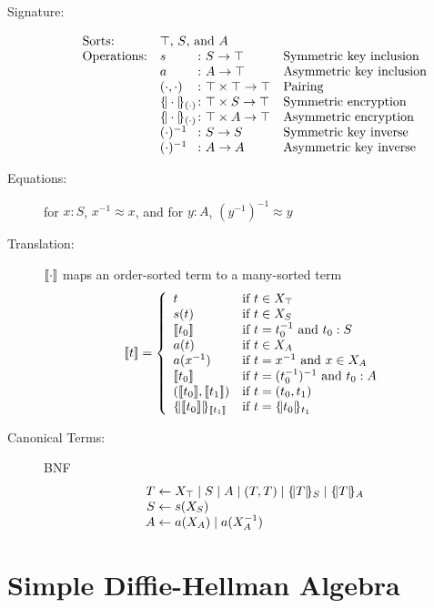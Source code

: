 \documentclass[12pt]{article}
\theoremstyle{definition}
\begin{document}
\begin{description}
\item[Signature:]
$$\begin{array}{ll@{{}\colon{}}ll}
\mbox{Sorts:}&\multicolumn{3}{l}{\mbox{$\top$, $S$, and $A$}}\\
\mbox{Operations:}&s&S\to\top& \mbox{Symmetric key inclusion}\\
&a&A\to\top& \mbox{Asymmetric key inclusion}\\
&(\cdot,\cdot)&\top\times\top\to\top& \mbox{Pairing}\\
&\enc{\cdot}{(\cdot)}&\top\times S\to\top& \mbox{Symmetric encryption}\\
&\enc{\cdot}{(\cdot)}&\top\times A\to\top& \mbox{Asymmetric encryption}\\
&(\cdot)^{-1}&S\to S& \mbox{Symmetric key inverse}\\
&(\cdot)^{-1}&A\to A& \mbox{Asymmetric key inverse}
\end{array}$$
\item[Equations:] for $x\colon S$, $x^{-1}\approx x$, and for $y\colon
  A$, $(y^{-1})^{-1}\approx y$
\item[Translation:] $[\![\cdot]\!]$ maps an order-sorted term to a
  many-sorted term
$$\sembrack{t}=\left\{
\begin{array}{ll}
t&\mbox{if $t\in X_\top$}\\
s(t)&\mbox{if $t\in X_S$}\\
\sembrack{t_0}&\mbox{if $t = t_0^{-1}$ and $t_0 : S$}\\
a(t)&\mbox{if $t\in X_A$}\\
a(x^{-1})&\mbox{if $t = x^{-1}$ and $x\in X_A$}\\
\sembrack{t_0}&\mbox{if $t = (t_0^{-1})^{-1}$ and $t_0 : A$}\\
(\sembrack{t_0},\sembrack{t_1})&\mbox{if $t=(t_0,t_1)$}\\
\enc{\sembrack{t_0}}{\sembrack{t_1}}&\mbox{if $t=\enc{t_0}{t_1}$}
\end{array}
\right.$$
\item[Canonical Terms:] BNF
$$\begin{array}{r@{{}\gets{}}l}
T&X_\top\mid S\mid A\mid(T,T)\mid\enc{T}{S}\mid
\enc{T}{A}
\\ S&s(X_S)
\\ A&a(X_A)\mid a(X_A^{-1})
\end{array}$$
\end{description}

\section{Simple Diffie-Hellman Algebra}
\end{document}
